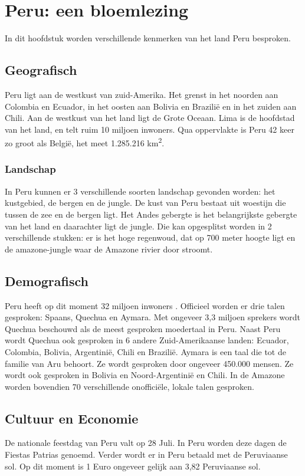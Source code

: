 \section{Peru: een bloemlezing}
In dit hoofdstuk worden verschillende kenmerken van het land Peru besproken. 
\subsection{Geografisch}
Peru ligt aan de westkust van zuid-Amerika. Het grenst in het noorden aan Colombia en Ecuador, in het oosten aan Bolivia en Brazilië en in het zuiden aan Chili. Aan de westkust van het land ligt de Grote Oceaan. Lima is de hoofdstad van het land, en telt ruim 10 miljoen inwoners. Qua oppervlakte is Peru 42 keer zo groot als België, het meet 1.285.216 km\textsuperscript{2}. 

\subsubsection{Landschap}
In Peru kunnen er 3 verschillende soorten landschap gevonden worden: het kustgebied, de bergen en de jungle. De kust van Peru bestaat uit woestijn die tussen de zee en de bergen ligt. Het Andes gebergte is het belangrijkste gebergte van het land en daarachter ligt de jungle. Die kan opgesplitst worden in 2 verschillende stukken: er is het hoge regenwoud, dat op 700 meter hoogte ligt en de amazone-jungle waar de Amazone rivier door stroomt. \autocite{ToPeru2020}

\subsection{Demografisch}
Peru heeft op dit moment 32 miljoen inwoners \autocite{Overheid2020}. Officieel worden er drie talen gesproken: Spaans, Quechua en Aymara. 
Met ongeveer 3,3 miljoen sprekers wordt Quechua beschouwd als de meest gesproken moedertaal in Peru. Naast Peru wordt Quechua ook gesproken in 6 andere Zuid-Amerikaanse landen: Ecuador, Colombia, Bolivia, Argentinië, Chili en Brazilië. \autocite{Cultura2020}
Aymara is een taal die tot de familie van Aru behoort. Ze wordt gesproken door ongeveer 450.000 mensen. \autocite{CulturaPeru2020} Ze wordt ook gesproken in Bolivia en Noord-Argentinië en Chili. In de Amazone worden bovendien 70 verschillende onofficiële, lokale talen gesproken. \autocite{dosmanosperu}

\subsection{Cultuur en Economie}
De nationale feestdag van Peru valt op 28 Juli. In Peru worden deze dagen de Fiestas Patrias genoemd. \autocite{dosmanosperu2018} Verder wordt er in Peru betaald met de Peruviaanse sol. Op dit moment is 1 Euro ongeveer gelijk aan 3,82 Peruviaanse sol.

